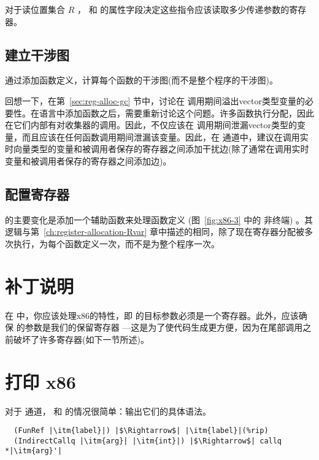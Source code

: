 \documentclass[11pt]{book}
\begin{document}
对于读位置集合 $R$ ，
 和  的属性字段决定这些指令应该读取多少传递参数的寄存器。

\subsection{建立干涉图}
\label{sec:build-interference-r4}

通过添加函数定义，计算每个函数的干涉图(而不是整个程序的干涉图)。

回想一下，在第~\ref{sec:reg-alloc-gc} 节中，讨论在
 调用期间溢出vector类型变量的必要性。在语言中添加函数之后，需要重新讨论这个问题。许多函数执行分配，因此在它们内部有对收集器的调用。因此，不仅应该在  调用期间泄漏vector类型的变量，而且应该在任何函数调用期间泄漏该变量。因此，在  通道中，建议在调用实时向量类型的变量和被调用者保存的寄存器之间添加干扰边(除了通常在调用实时变量和被调用者保存的寄存器之间添加边)。


\subsection{配置寄存器}

 的主要变化是添加一个辅助函数来处理函数定义 (图~\ref{fig:x86-3} 中的 \Def{} 非终端) 。其逻辑与第~\ref{ch:register-allocation-Rvar} 章中描述的相同，除了现在寄存器分配被多次执行，为每个函数定义一次，而不是为整个程序一次。


\section{补丁说明}

在  中，你应该处理x86的特性，即  的目标参数必须是一个寄存器。此外，应该确保
 的参数是我们的保留寄存器 ---这是为了使代码生成更方便，因为在尾部调用之前破坏了许多寄存器(如下一节所述)。

\section{打印 x86}

对于  通道，  和
 的情况很简单：输出它们的具体语法。
\begin{lstlisting}
  (FunRef |\itm{label}|) |$\Rightarrow$| |\itm{label}|(%rip)
  (IndirectCallq |\itm{arg}| |\itm{int}|) |$\Rightarrow$| callq *|\itm{arg}'|
\end{lstlisting}
\end{document}
